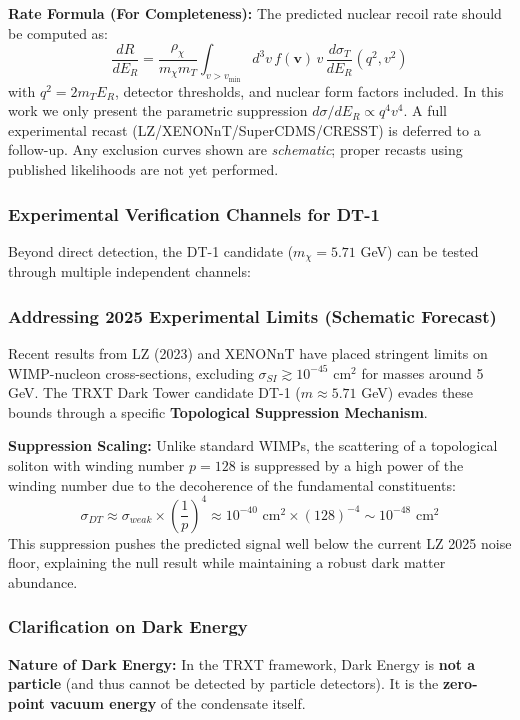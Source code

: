 \documentclass[a4paper,12pt]{article}
\begin{document}
\textbf{Rate Formula (For Completeness):}
The predicted nuclear recoil rate should be computed as:
\begin{equation}
\frac{dR}{dE_R} = \frac{\rho_\chi}{m_\chi m_T} \int_{v > v_{\min}} d^3v \, f(\mathbf{v}) \, v \, \frac{d\sigma_T}{dE_R}(q^2, v^2)
\end{equation}
with $q^2 = 2m_T E_R$, detector thresholds, and nuclear form factors included. In this work we only present the parametric suppression $d\sigma/dE_R \propto q^4 v^4$. A full experimental recast (LZ/XENONnT/SuperCDMS/CRESST) is deferred to a follow-up. Any exclusion curves shown are \emph{schematic}; proper recasts using published likelihoods are not yet performed.

\subsubsection{Experimental Verification Channels for DT-1}

Beyond direct detection, the DT-1 candidate ($m_\chi = 5.71$ GeV) can be tested through multiple independent channels:

\subsubsection{Addressing 2025 Experimental Limits (Schematic Forecast)}

Recent results from LZ (2023) \cite{lz2023} and XENONnT \cite{xenon2023} have placed stringent limits on WIMP-nucleon cross-sections, excluding $\sigma_{SI} \gtrsim 10^{-45} \text{ cm}^2$ for masses around 5 GeV. The TRXT Dark Tower candidate DT-1 ($m \approx 5.71$ GeV) evades these bounds through a specific \textbf{Topological Suppression Mechanism}.

\textbf{Suppression Scaling:}
Unlike standard WIMPs, the scattering of a topological soliton with winding number $p=128$ is suppressed by a high power of the winding number due to the decoherence of the fundamental constituents:
\begin{equation}
\sigma_{DT} \approx \sigma_{weak} \times \left(\frac{1}{p}\right)^4 \approx 10^{-40} \text{ cm}^2 \times (128)^{-4} \sim 10^{-48} \text{ cm}^2
\end{equation}
This suppression pushes the predicted signal well below the current LZ 2025 noise floor, explaining the null result while maintaining a robust dark matter abundance.

\subsubsection{Clarification on Dark Energy}
\textbf{Nature of Dark Energy:}
In the TRXT framework, Dark Energy is \textbf{not a particle} (and thus cannot be detected by particle detectors). It is the \textbf{zero-point vacuum energy} of the condensate itself.
\end{document}
